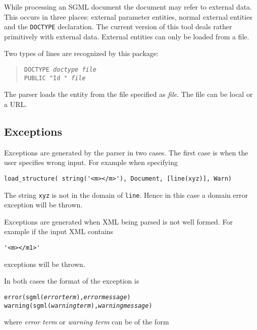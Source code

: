 While processing an SGML document the document may refer to external 
data. This occurs in three places: external parameter entities, normal 
external entities and the {\tt DOCTYPE} declaration. The current version 
of this tool deals rather primitively with external data. External 
entities can only be loaded from a file.

Two types of lines are recognized by this package:

\begin{quote}
  \obeylines \obeyspaces \tt {\tt DOCTYPE} {\it doctype} {\it file}\\
  {\tt PUBLIC} {\tt "Id "} {\it file} 
\end{quote}

The parser loads the entity from the file specified as {\it file}.
The file can be local or a URL.

\subsection{Exceptions}

Exceptions are generated by the parser in two cases. The first case is when
the user specifies wrong input.  For example when specifying
\begin{verbatim}
load_structure( string('<m></m>'), Document, [line(xyz)], Warn)
\end{verbatim}
The string {\tt xyz} is not in the domain of {\tt line}. Hence in this
case a domain error exception will be thrown.

Exceptions are generated when XML being parsed is not well formed. For
example if the input XML contains
\begin{verbatim}
'<m></m1>'
\end{verbatim}
exceptions will be thrown.

In both cases the format of the exception is
\begin{alltt}
  error( sgml({\it error term}), {\it error message})
  warning( sgml({\it warning term}), {\it warning message})
\end{alltt}
where {\it error term} or {\it warning term} can be of the form

